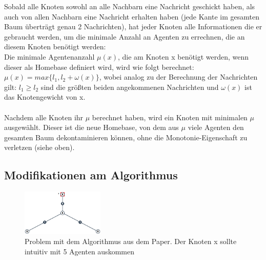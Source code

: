 Sobald alle Knoten sowohl an alle Nachbarn eine Nachricht geschickt haben, als auch von allen Nachbarn eine Nachricht erhalten haben (jede Kante im gesamten Baum überträgt genau 2 Nachrichten), hat jeder Knoten alle Informationen die er gebraucht werden, um die minimale Anzahl an Agenten zu errechnen, die an diesem Knoten benötigt werden:
\\
Die minimale Agentenanzahl $\mu(x)$, die am Knoten x benötigt werden, wenn dieser als Homebase definiert wird, wird wie folgt berechnet:
\\
$\mu(x) = max\{l_{1},  l_{2} + \omega(x)\}$, wobei analog zu der Berechnung der Nachrichten gilt: $l_{1} \ge l_{2}$ sind die größten beiden angekommenen Nachrichten und $\omega(x)$ ist das Knotengewicht von x.
\\
\\
Nachdem alle Knoten ihr $\mu$ berechnet haben, wird ein Knoten mit minimalen $\mu$ ausgewählt. Dieser ist die neue Homebase, von dem aus $\mu$ viele Agenten den gesamten Baum dekontaminieren können, ohne die Monotonie-Eigenschaft zu verletzen (siehe oben).



\subsection{Modifikationen am Algorithmus}


	\begin{figure}
		\begin{center}
			\includegraphics[width=0.35\textwidth]{bilder/abb_paper_problem.png}
		\end{center}
		\caption{Problem mit dem Algorithmus aus dem Paper. Der Knoten x sollte intuitiv mit 5 Agenten auskommen}
		\label{fig:negBeispielPaperAlgo}
	\end{figure}

